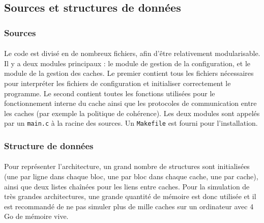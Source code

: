 \subsection{Sources et structures de données}

\subsubsection{Sources}
\paragraph{}
Le code est divisé en de nombreux fichiers, afin d'être relativement modularisable. Il y a deux modules principaux : le module de gestion de la configuration, et le module de la gestion des caches. Le premier contient tous les fichiers nécessaires pour interpréter les fichiers de configuration et initialiser correctement le programme. Le second contient toutes les fonctions utilisées pour le fonctionnement interne du cache ainsi que les protocoles de communication entre les caches (par exemple la politique de cohérence). Les deux modules sont appelés par un \verb!main.c! à la racine des sources. Un \verb!Makefile! est fourni pour l'installation.

\subsubsection{Structure de données}
\paragraph{}
Pour représenter l'architecture, un grand nombre de structures sont initialisées (une par ligne dans chaque bloc, une par bloc dans chaque cache, une par cache), ainsi que deux listes chaînées pour les liens entre caches. Pour la simulation de très grandes architectures, une grande quantité de mémoire est donc utilisée et il est recommandé de ne pas simuler plus de mille caches sur un ordinateur avec 4 Go de mémoire vive.
